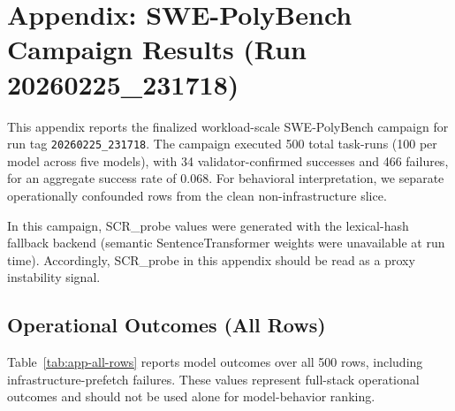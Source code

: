 \section{Appendix: SWE-PolyBench Campaign Results (Run 20260225\_231718)}
\label{app:swepolybench-20260225-231718}

This appendix reports the finalized workload-scale SWE-PolyBench campaign for run tag \texttt{20260225\_231718}. The campaign executed 500 total task-runs (100 per model across five models), with 34 validator-confirmed successes and 466 failures, for an aggregate success rate of 0.068. For behavioral interpretation, we separate operationally confounded rows from the clean non-infrastructure slice.

In this campaign, SCR\_probe values were generated with the lexical-hash fallback backend (semantic SentenceTransformer weights were unavailable at run time). Accordingly, SCR\_probe in this appendix should be read as a proxy instability signal.

\subsection{Operational Outcomes (All Rows)}
Table~\ref{tab:app-all-rows} reports model outcomes over all 500 rows, including infrastructure-prefetch failures. These values represent full-stack operational outcomes and should not be used alone for model-behavior ranking.

\begin{table}[ht]
  \centering
  \small
  \caption{Model outcomes on all campaign rows (operational view).}
  \label{tab:app-all-rows}
\end{table}

